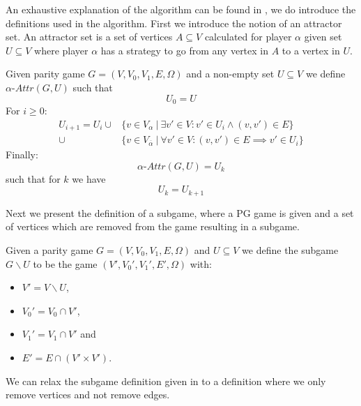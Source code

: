 An exhaustive explanation of the algorithm can be found in \cite{ZIELONKA1998135}, we do introduce the definitions used in the algorithm. First we introduce the notion of an attractor set. An attractor set is a set of vertices $A \subseteq V$ calculated for player $\alpha$ given set $U \subseteq V$ where player $\alpha$ has a strategy to go from any vertex in $A$ to a vertex in $U$.

\begin{definition}\cite{ZIELONKA1998135}
	\label{def_attr}Given parity game $G = (V,V_0,V_1,E,\Omega)$ and a non-empty set $U \subseteq V$ we define $\alpha\textit{-Attr}(G,U)$ such that
	\[U_0 = U \]
	For $i \geq 0$:
	\begin{align*}
	U_{i+1} = U_i\cup
	&\{v \in V_\alpha\ |\ \exists v' \in V : v' \in U_i \wedge (v,v') \in E \}\\
	\cup &\{v \in V_{\overline{\alpha}}\ |\ \forall v' \in V :(v,v') \in E \implies v' \in U_i \}
	\end{align*}
	Finally:
	\[\alpha\textit{-Attr}(G,U) = U_k \]
	such that for $k$ we have
	\[U_k = U_{k+1} \]
\end{definition}

Next we present the definition of a subgame, where a PG game is given and a set of vertices which are removed from the game resulting in a subgame.

\begin{definition}\cite{ZIELONKA1998135}
\label{def_org_subgame}
Given a parity game $G = (V,V_0,V_1, E,\Omega)$ and $U \subseteq V$ we define the subgame $G \backslash U$ to be the game $(V', V_0', V_1', E', \Omega)$ with:
\begin{itemize}
	\item $V' = V \backslash U$,
	\item $V_0' = V_0 \cap V'$,
	\item $V_1' = V_1 \cap V'$ and
	\item $E' = E \cap (V' \times V')$.
\end{itemize}
\end{definition}

We can relax the subgame definition given in \cite{ZIELONKA1998135} to a definition where we only remove vertices and not remove edges.

